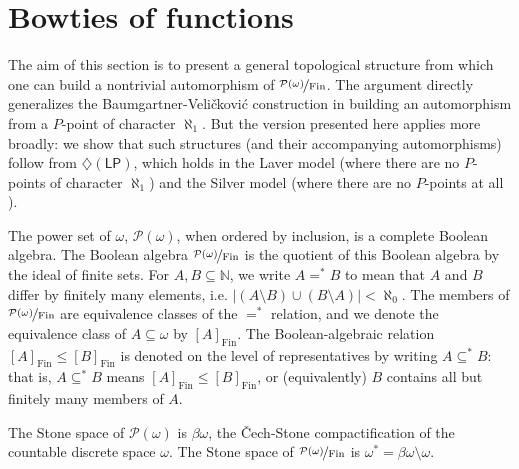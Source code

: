 \documentclass[11pt,leqno]{amsart}
\theoremstyle{definition}
\theoremstyle{remark}
\newcommand{\N}{\mathbb{N}}
\renewcommand{\P}{\mathcal{P}}
\newcommand{\<}{\langle}
\renewcommand{\>}{\rangle}
\renewcommand{\b}{\beta}
\newcommand{\w}{\omega}
\newcommand{\0}{\emptyset}
\newcommand{\sub}{\subseteq}
\newcommand{\card}[1]{\left\lvert #1 \right\rvert}
\newcommand{\1}{1\hspace{-1.75mm}1}
\newcommand{\pwmf}{\nicefrac{\mathcal{P}(\w)}{\mathrm{Fin}}}
\newcommand{\pfa}{\ensuremath{\mathsf{PFA}}\xspace}
\newcommand{\ma}{\ensuremath{\mathsf{MA}}\xspace}
\newcommand{\dLP}{\diamondsuit(\mathsf{LP})}
\begin{document}
\section{Bowties of functions}

The aim of this section is to present a general topological structure from which one can build a nontrivial automorphism of $\pwmf$. The argument directly generalizes the Baumgartner-Veli\v{c}kovi\'c construction in \cite{Vel} building an automorphism from a $P$-point of character $\aleph_1$. But the version presented here applies more broadly: we show that such structures (and their accompanying automorphisms) follow from $\dLP$, which holds in the Laver model (where there are no $P$-points of character $\aleph_1$) and the Silver model (where there are no $P$-points at all \cite{CG}).  

The power set of $\w$, $\P(\w)$, when ordered by inclusion, is a complete Boolean algebra. 
The Boolean algebra $\pwmf$ 
is the quotient of this Boolean algebra by the ideal of finite sets. 
For $A,B \sub \N$, we write $A =^* B$ to mean that $A$ and $B$ differ by finitely many elements, i.e. $\card{(A \setminus B) \cup (B \setminus A)} < \aleph_0$. 
The members of $\pwmf$ are equivalence classes of the $=^*$ relation, and we denote the equivalence class of $A \sub \w$ by $[A]_\text{Fin}$. 
The Boolean-algebraic relation $[A]_\text{Fin} \leq [B]_\text{Fin}$ is denoted on the level of representatives by writing $A \sub^* B$: that is, $A \sub^* B$ means $[A]_\text{Fin} \leq [B]_\text{Fin}$, or (equivalently) $B$ contains all but finitely many members of $A$. 

The Stone space of $\P(\w)$ is $\b\w$, the \v{C}ech-Stone compactification of the countable discrete space $\w$. The Stone space of $\pwmf$ is $\w^* = \b\w \setminus \w$. 
\end{document}
